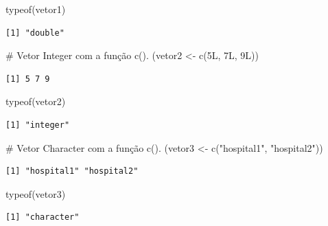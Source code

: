 \documentclass[
  letterpaper,
  DIV=11,
  numbers=noendperiod]{scrreprt}
\newenvironment{Shaded}{\begin{snugshade}}{\end{snugshade}}
\newcommand{\CommentTok}[1]{\textcolor[rgb]{0.37,0.37,0.37}{#1}}
\newcommand{\FunctionTok}[1]{\textcolor[rgb]{0.28,0.35,0.67}{#1}}
\newcommand{\NormalTok}[1]{\textcolor[rgb]{0.00,0.23,0.31}{#1}}
\newcommand{\OtherTok}[1]{\textcolor[rgb]{0.00,0.23,0.31}{#1}}
\newcommand{\StringTok}[1]{\textcolor[rgb]{0.13,0.47,0.30}{#1}}
\begin{document}
\begin{Shaded}
\begin{Highlighting}[]
\FunctionTok{typeof}\NormalTok{(vetor1)}
\end{Highlighting}
\end{Shaded}

\begin{verbatim}
[1] "double"
\end{verbatim}

\begin{Shaded}
\begin{Highlighting}[]
\CommentTok{\# Vetor Integer com a função c().}
\NormalTok{(vetor2 }\OtherTok{\textless{}{-}} \FunctionTok{c}\NormalTok{(5L, 7L, 9L))}
\end{Highlighting}
\end{Shaded}

\begin{verbatim}
[1] 5 7 9
\end{verbatim}

\begin{Shaded}
\begin{Highlighting}[]
\FunctionTok{typeof}\NormalTok{(vetor2)}
\end{Highlighting}
\end{Shaded}

\begin{verbatim}
[1] "integer"
\end{verbatim}

\begin{Shaded}
\begin{Highlighting}[]
\CommentTok{\# Vetor Character com a função c().}
\NormalTok{(vetor3 }\OtherTok{\textless{}{-}} \FunctionTok{c}\NormalTok{(}\StringTok{"hospital1"}\NormalTok{, }\StringTok{"hospital2"}\NormalTok{))}
\end{Highlighting}
\end{Shaded}

\begin{verbatim}
[1] "hospital1" "hospital2"
\end{verbatim}

\begin{Shaded}
\begin{Highlighting}[]
\FunctionTok{typeof}\NormalTok{(vetor3)}
\end{Highlighting}
\end{Shaded}

\begin{verbatim}
[1] "character"
\end{verbatim}
\end{document}

